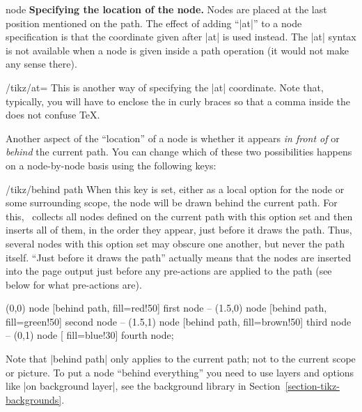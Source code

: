 \begin{pathoperation}{node}
    \medskip
    \textbf{Specifying the location of the node.}
    Nodes are placed at the last position mentioned on the path. The effect of
    adding ``|at|'' to a node specification is that the coordinate given after
    |at| is used instead. The |at| syntax is not available when a node is given
    inside a path operation (it would not make any sense there).

    \begin{key}{/tikz/at=}
        This is another way of specifying the |at| coordinate. Note that,
        typically, you will have to enclose the  in curly
        braces so that a comma inside the  does not confuse
        \TeX.
    \end{key}

    Another aspect of the ``location'' of a node is whether it appears \emph{in
    front of} or \emph{behind} the current path. You can change which of these
    two possibilities happens on a node-by-node basis using the following keys:
    \begin{key}{/tikz/behind path}
        When this key is set, either as a local option for the node or some
        surrounding scope, the node will be drawn behind the current path. For
        this, \tikzname\ collects all nodes defined on the current path with
        this option set and then inserts all of them, in the order they appear,
        just before it draws the path. Thus, several nodes with this option set
        may obscure one another, but never the path itself. ``Just before it
        draws the path'' actually means that the nodes are inserted into the
        page output just before any pre-actions are applied to the path (see
        below for what pre-actions are).
\begin{codeexample}[]
\tikz \fill [fill=blue!50, draw=blue, very thick]
      (0,0)   node [behind path, fill=red!50]   {first node}
   -- (1.5,0) node [behind path, fill=green!50] {second node}
   -- (1.5,1) node [behind path, fill=brown!50] {third node}
   -- (0,1)   node [             fill=blue!30]  {fourth node};
\end{codeexample}

        Note that |behind path| only applies to the current path; not to the
        current scope or picture. To put a node ``behind everything'' you need
        to use layers and options like |on background layer|, see the
        background library in Section~\ref{section-tikz-backgrounds}.
    \end{key}


\end{pathoperation}
